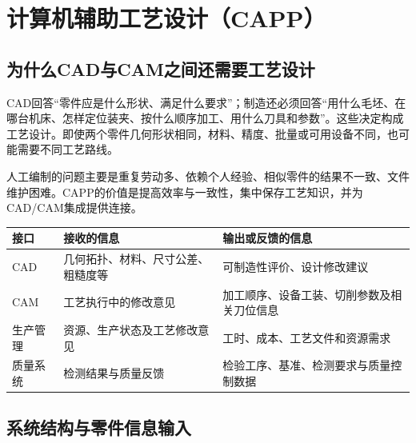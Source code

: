 \chapter{计算机辅助工艺设计（CAPP）}
\label{ch:capp}

\section{为什么CAD与CAM之间还需要工艺设计}
CAD回答“零件应是什么形状、满足什么要求”；制造还必须回答“用什么毛坯、在哪台机床、怎样定位装夹、按什么顺序加工、用什么刀具和参数”。这些决定构成工艺设计。即使两个零件几何形状相同，材料、精度、批量或可用设备不同，也可能需要不同工艺路线。


人工编制的问题主要是重复劳动多、依赖个人经验、相似零件的结果不一致、文件维护困难。CAPP的价值是提高效率与一致性，集中保存工艺知识，并为CAD/CAM集成提供连接。

\begin{center}
\begin{tabularx}{\linewidth}{@{}p{.18\linewidth}XX@{}}
\toprule
接口 & 接收的信息 & 输出或反馈的信息\\
\midrule
CAD & 几何拓扑、材料、尺寸公差、粗糙度等 & 可制造性评价、设计修改建议\\
CAM & 工艺执行中的修改意见 & 加工顺序、设备工装、切削参数及相关刀位信息\\
生产管理 & 资源、生产状态及工艺修改意见 & 工时、成本、工艺文件和资源需求\\
质量系统 & 检测结果与质量反馈 & 检验工序、基准、检测要求与质量控制数据\\
\bottomrule
\end{tabularx}
\end{center}


\section{系统结构与零件信息输入}


